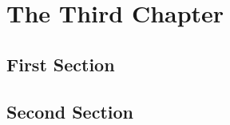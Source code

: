 \chapter{The Third Chapter}
\label{sec:methods}
\kant[12-13] %
\section{First Section}
\kant[14]    %
\section{Second Section}
\kant[15]    %